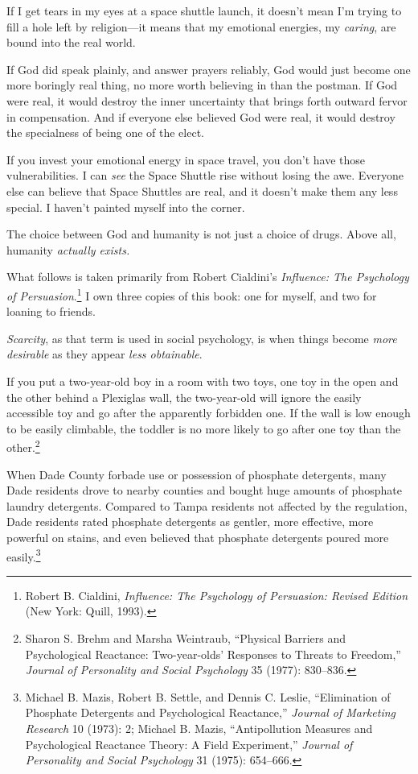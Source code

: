 {
 If I get tears in my eyes at a space shuttle launch, it
doesn't mean I'm trying to fill a hole
left by religion---it means that my emotional energies, my
\textit{caring}, are bound into the real world.}

{
 If God did speak plainly, and answer prayers reliably, God would
just become one more boringly real thing, no more worth believing in
than the postman. If God were real, it would destroy the inner
uncertainty that brings forth outward fervor in compensation. And if
everyone else believed God were real, it would destroy the specialness
of being one of the elect.}

{
 If you invest your emotional energy in space travel, you
don't have those vulnerabilities. I can \textit{see}
the Space Shuttle rise without losing the awe. Everyone else can
believe that Space Shuttles are real, and it doesn't
make them any less special. I haven't painted myself
into the corner.}

{
 The choice between God and humanity is not just a choice of drugs.
Above all, humanity \textit{actually exists.}}

\myendsectiontext


{
 What follows is taken primarily from Robert
Cialdini's \textit{Influence: The Psychology of
Persuasion}.\footnote{Robert B. Cialdini, \textit{Influence: The Psychology of
Persuasion: Revised Edition} (New York: Quill, 1993).} I own three copies of this book: one
for myself, and two for loaning to friends. }

{
 \textit{Scarcity}, as that term is used in social psychology, is
when things become \textit{more desirable} as they appear \textit{less
obtainable}.}

{
 If you put a two-year-old boy in a room with two toys, one toy in
the open and the other behind a Plexiglas wall, the two-year-old will
ignore the easily accessible toy and go after the apparently forbidden
one. If the wall is low enough to be easily climbable, the toddler is
no more likely to go after one toy than the other.\footnote{Sharon S. Brehm and Marsha Weintraub,
``Physical Barriers and Psychological Reactance:
Two-year-olds' Responses to Threats to
Freedom,'' \textit{Journal of Personality and Social
Psychology} 35 (1977): 830--836.}}

{
 When Dade County forbade use or possession of phosphate
detergents, many Dade residents drove to nearby counties and bought
huge amounts of phosphate laundry detergents. Compared to Tampa
residents not affected by the regulation, Dade residents rated
phosphate detergents as gentler, more effective, more powerful on
stains, and even believed that phosphate detergents poured more
easily.\footnote{Michael B. Mazis, Robert B. Settle, and Dennis C. Leslie,
``Elimination of Phosphate Detergents and
Psychological Reactance,'' \textit{Journal of
Marketing Research} 10 (1973): 2; Michael B. Mazis,
``Antipollution Measures and Psychological Reactance
Theory: A Field Experiment,'' \textit{Journal of
Personality and Social Psychology} 31 (1975): 654--666.}}

